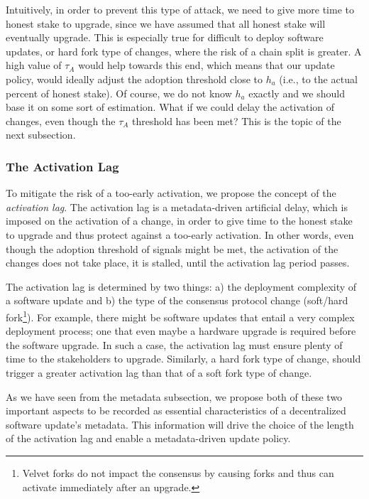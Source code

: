 Intuitively, in order to prevent this type of attack, we need to give more time to honest stake to upgrade, since we have assumed that all honest stake will eventually upgrade. This is especially true for difficult to deploy software updates, or hard fork type of changes, where the risk of a chain split is greater. A high value of $\tau_A$ would help towards this end, which means that our update policy, would ideally adjust the adoption threshold close to $h_a$ (i.e., to the actual percent of honest stake). Of course, we do not know $h_a$ exactly and we should base it on some sort of estimation. What if we could delay the activation of changes, even though the $\tau_A$ threshold has been met? This is the topic of the next subsection. 

\subsubsection{The Activation Lag}
To mitigate the risk of a too-early activation, %
we propose the concept of the \emph{activation lag}. The activation lag is a metadata-driven artificial delay, which is imposed on the activation of a change, in order to give time to the honest stake to upgrade and thus protect against a too-early activation. In other words, even though  the adoption threshold of signals might be met, the activation of the changes does not take place, it is stalled, until the activation lag period passes.

The activation lag is determined by two things: a) the deployment complexity of a software update and b) the type of the consensus protocol change (soft/hard fork\footnote{Velvet forks \cite{velvet} do not impact the consensus by causing forks and thus can activate immediately after an upgrade.}).
For example, there might be software updates that entail a very complex deployment process; one that even maybe a hardware upgrade is required before the software upgrade. In such a case, the activation lag must ensure plenty of time to the stakeholders to upgrade. Similarly, a hard fork type of change, should trigger a greater activation lag than that of a soft fork type of change. 

As we have seen from the metadata subsection, we propose both of these two important aspects to be recorded as essential characteristics of a decentralized software update's metadata. This information will drive the choice of the length of the activation lag and enable a metadata-driven update policy.

